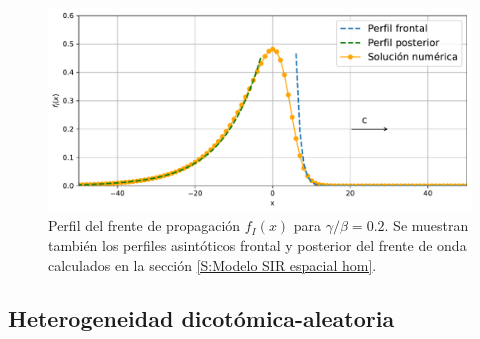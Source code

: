 \begin{figure}[h]
    \centering
    \includegraphics[width=\imsizeL]{f_I(x)_hom.pdf}
    \caption{Perfil del frente de propagación $f_I(x)$ para $\gamma/\beta=0.2$. Se muestran también los perfiles asintóticos frontal y posterior 
    del frente de onda calculados en la sección \ref{S:Modelo SIR espacial hom}.}
    \label{fig:f_I(x)}
\end{figure}

\subsection{Heterogeneidad dicotómica-aleatoria}
\label{al}

